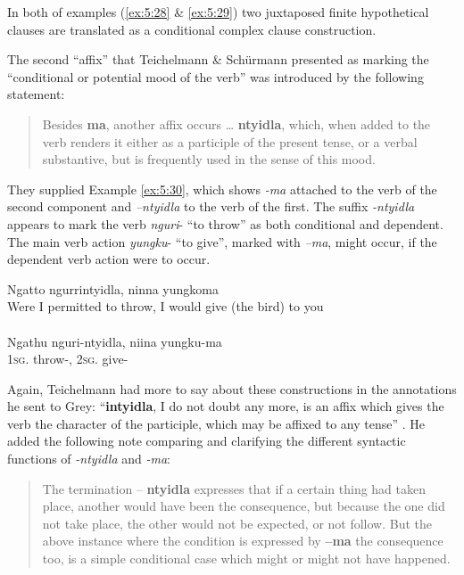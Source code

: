 In both of examples (\ref{ex:5:28} \& \ref{ex:5:29}) two juxtaposed finite hypothetical clauses are translated as a conditional complex clause construction.

The second “affix” that Teichelmann \& Schürmann presented as marking the “conditional or potential mood of the verb” was introduced by the following statement: 

\begin{quote}
    Besides \textbf{ma}, another affix occurs … \textbf{ntyidla}, which, when added to the verb renders it either as a participle of the present tense, or a verbal substantive, but is frequently used in the sense of this mood. \citep[19]{teichelmann_outlines_1840}
\end{quote}

They supplied Example \ref{ex:5:30}, which shows \textit{-ma} attached to the verb of the second component and \textit{–ntyidla} to the verb of the first. The suffix \textit{-ntyidla} appears to mark the verb \textit{nguri}- “to throw” as both conditional and dependent. The main verb action \textit{yungku}- “to give”, marked with \textit{–ma}, might occur, if the dependent verb action were to occur.

\ea\label{ex:5:30}
Ngatto     ngurrintyidla,     ninna           yungkoma \\
\glt Were I permitted to throw, I would give (the bird) to you \\
\citep[19]{teichelmann_outlines_1840} \\
\gll Ngathu	 nguri-ntyidla,      niina           yungku-ma \\
1\textsc{sg}.  throw-,     2\textsc{sg}.     give-\\
\z

Again, Teichelmann had more to say about these constructions in the annotations he sent to Grey: “\textbf{intyidla}, I do not doubt any more, is an affix which gives the verb the character of the participle, which may be affixed to any tense” \citep[22]{teichelmann_annotations_1858}. He added the following note comparing and clarifying the different syntactic functions of \textit{-ntyidla} and \textit{-ma}:

\begin{quote}
    The termination – \textbf{ntyidla} expresses that if a certain thing had taken place, another would have been the consequence, but because the one did not take place, the other would not be expected, or not follow. But the above instance where the condition is expressed by \textbf{–ma} the consequence too, is a simple conditional case which might or might not have happened. \citep[19]{teichelmann_annotations_1858}
\end{quote}

